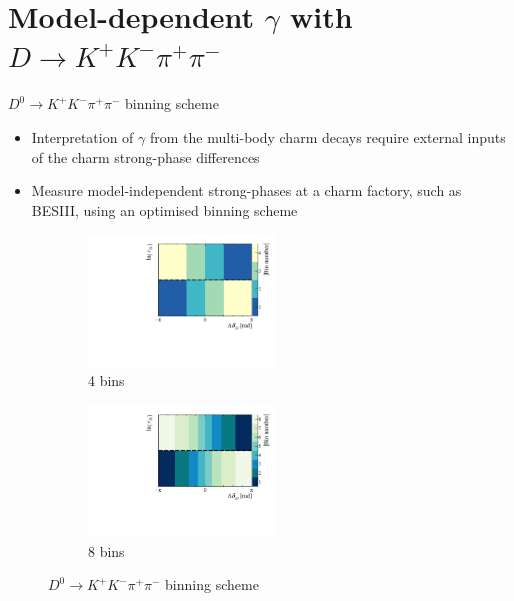 \documentclass[xcolor={dvipsnames}]{beamer}
\begin{document}
\section{Model-dependent \texorpdfstring{$\gamma$}{gamma} with \texorpdfstring{$D\to K^+K^-\pi^+\pi^-$}{D2KKpipi}}
\begin{frame}{$D^0\to K^+K^-\pi^+\pi^-$ binning scheme}
  \begin{itemize}
    \setlength\itemsep{0.5em}
    \item{Interpretation of $\gamma$ from the multi-body charm decays require external inputs of the charm strong-phase differences}
    \item{Measure model-independent strong-phases at a charm factory, such as BESIII, using an optimised binning scheme}
  \end{itemize}
  \begin{figure}
    \centering
    \begin{subfigure}{0.5\textwidth}
      \centering
      \includegraphics[height = 3.5cm]{Plots/BinningSchemePlot_4Bins.pdf}
      \vspace{-0.3cm}
      \caption*{4 bins}
    \end{subfigure}%
    \begin{subfigure}{0.5\textwidth}
      \centering
      \includegraphics[height = 3.5cm]{Plots/BinningSchemePlot_8Bins.pdf}
      \vspace{-0.3cm}
      \caption*{8 bins}
    \end{subfigure}
    \caption*{$D^0\to K^+K^-\pi^+\pi^-$ binning scheme}
  \end{figure}
\end{frame}
\end{document}

